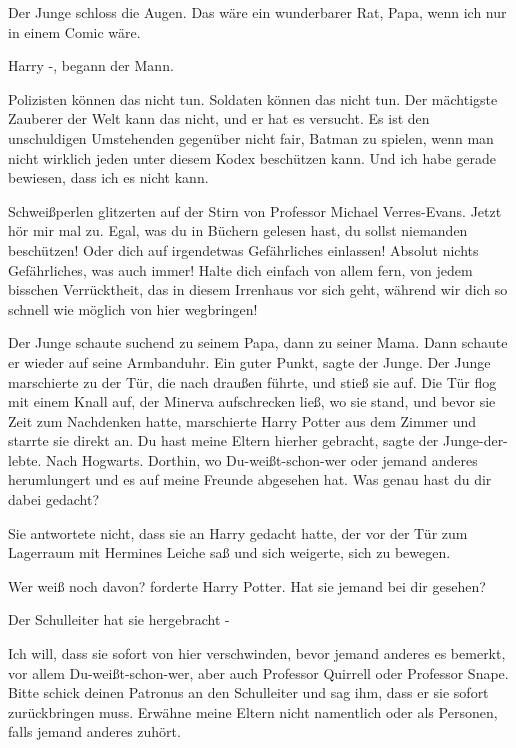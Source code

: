Der Junge schloss die Augen. \glqq{}Das wäre ein wunderbarer Rat, Papa, wenn ich
nur in einem Comic wäre.\grqq{}

\glqq{}Harry -\grqq{}, begann der Mann.

\glqq{}Polizisten können das nicht tun. Soldaten können das nicht tun. Der
mächtigste Zauberer der Welt kann das nicht, und er hat es versucht. Es ist den
unschuldigen Umstehenden gegenüber nicht fair, Batman zu spielen, wenn man nicht
wirklich jeden unter diesem Kodex beschützen kann. Und ich habe gerade bewiesen,
dass ich es nicht kann.\grqq{}

Schweißperlen glitzerten auf der Stirn von Professor Michael Verres-Evans. \glqq{}
Jetzt hör mir mal zu. Egal, was du in Büchern gelesen hast, du sollst niemanden
beschützen! Oder dich auf irgendetwas Gefährliches einlassen! Absolut nichts
Gefährliches, was auch immer! Halte dich einfach von allem fern, von jedem
bisschen Verrücktheit, das in diesem Irrenhaus vor sich geht, während wir dich
so schnell wie möglich von hier wegbringen!\grqq{}

Der Junge schaute suchend zu seinem Papa, dann zu seiner Mama. Dann schaute
er wieder auf seine Armbanduhr. \glqq{}Ein guter Punkt\grqq{}, sagte der Junge.
Der Junge marschierte zu der Tür, die nach draußen führte, und stieß sie auf.
Die Tür flog mit einem Knall auf, der Minerva aufschrecken ließ, wo sie stand,
und bevor sie Zeit zum Nachdenken hatte, marschierte Harry Potter aus dem Zimmer
und starrte sie direkt an. \glqq{}Du hast meine Eltern hierher gebracht\grqq{},
sagte der Junge-der-lebte. \glqq{}Nach Hogwarts. Dorthin, wo Du-weißt-schon-wer
oder jemand anderes herumlungert und es auf meine Freunde abgesehen hat. Was
genau hast du dir dabei gedacht?\grqq{}

Sie antwortete nicht, dass sie an Harry gedacht hatte, der vor der Tür zum
Lagerraum mit Hermines Leiche saß und sich weigerte, sich zu bewegen.

\glqq{}Wer weiß noch davon?\grqq{} forderte Harry Potter. \glqq{}Hat sie jemand
bei dir gesehen?\grqq{}

\glqq{}Der Schulleiter hat sie hergebracht -\grqq{}

\glqq{}Ich will, dass sie sofort von hier verschwinden, bevor jemand anderes es
bemerkt, vor allem Du-weißt-schon-wer, aber auch Professor Quirrell oder
Professor Snape. Bitte schick deinen Patronus an den Schulleiter und sag ihm,
dass er sie sofort zurückbringen muss. Erwähne meine Eltern nicht namentlich
oder als Personen, falls jemand anderes zuhört.\grqq{}

